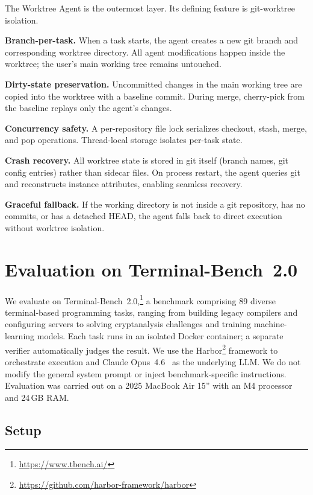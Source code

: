 \documentclass{article}
\begin{document}
The Worktree Agent is the outermost layer.  Its defining feature is git-worktree isolation.

\textbf{Branch-per-task.}  When a task starts, the agent creates a new git branch and corresponding worktree directory.  All agent modifications happen inside the worktree; the user's main working tree remains untouched.

\textbf{Dirty-state preservation.}  Uncommitted changes in the main working tree are copied into the worktree with a baseline commit.  During merge, cherry-pick from the baseline replays only the agent's changes.

\textbf{Concurrency safety.}  A per-repository file lock serializes checkout, stash, merge, and pop operations.  Thread-local storage isolates per-task state.

\textbf{Crash recovery.}  All worktree state is stored in git itself (branch names, git config entries) rather than sidecar files.  On process restart, the agent queries git and reconstructs instance attributes, enabling seamless recovery.

\textbf{Graceful fallback.}  If the working directory is not inside a git repository, has no commits, or has a detached HEAD, the agent falls back to direct execution without worktree isolation.

\section{Evaluation on Terminal-Bench~2.0}
\label{sec:evaluation}

We evaluate on Terminal-Bench~2.0,\footnote{\url{https://www.tbench.ai/}} a benchmark comprising 89 diverse terminal-based programming tasks, ranging from building legacy compilers and configuring servers to solving cryptanalysis challenges and training machine-learning models.  Each task runs in an isolated Docker container; a separate verifier automatically judges the result.  We use the Harbor\footnote{\url{https://github.com/harbor-framework/harbor}} framework to orchestrate execution and Claude Opus~4.6~\citep{anthropic2026opus46} as the underlying LLM.  We do not modify the general system prompt or inject benchmark-specific instructions.  Evaluation was carried out on a 2025 MacBook Air 15'' with an M4 processor and 24\,GB RAM.

\subsection{Setup}
\end{document}
